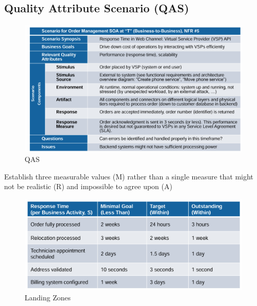 \documentclass[../Main.tex]{subfiles}
\begin{document}
\subsection{Quality Attribute Scenario (QAS)}
\begin{figure}[H] 
    \centering
    \includegraphics{Images/qas.png}
    \caption{QAS}
    \label{fig:qas}
\end{figure}

Establish three measurable values (M) rather than a single measure that might not be realistic (R) and impossible to agree upon (A) 

\begin{figure}[H]
    \centering
    \includegraphics{Images/landingzone.png}
    \caption{Landing Zones}
    \label{fig:landingzones}
\end{figure}

\newpage
\end{document}
